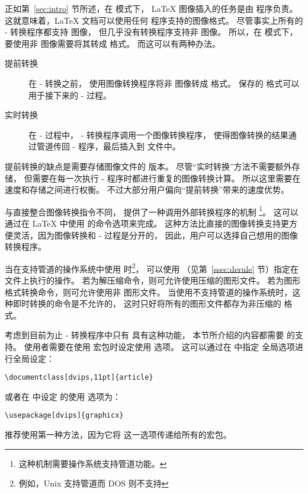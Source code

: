 正如第~\ref{sec:intro} 节所述，在  模式下，
\LaTeX{} 图像插入的任务是由  程序负责。
这就意味着，\LaTeX{} 文档可以使用任何  程序支持的图像格式。
尽管事实上所有的 - 转换程序都支持  图像，
但几乎没有转换程序支持非  图像。
所以，在  模式下，
要使用非  图像需要将其转成  格式。
而这可以有两种办法。
\begin{description}
	\item[提前转换] 在 - 转换之前，
	使用图像转换程序将非 图像转成 格式。
	保存的  格式可以用于接下来的 - 过程。
	
	\item[实时转换] 在 - 过程中，
	- 转换程序调用一个图像转换程序，
	使得图像转换的结果通过管道传回 - 程序，最后插入到  文件中。
\end{description}
提前转换的缺点是需要存储图像文件的  版本。
尽管“实时转换”方法不需要额外存储，
但需要在每一次执行 - 程序时都进行重复的图像转换计算。
所以这里需要在速度和存储之间进行权衡。
不过大部分用户偏向“提前转换”带来的速度优势。

与直接整合图像转换指令不同， 提供了一种调用外部转换程序的机制
\footnote{
	这种机制需要操作系统支持管道功能。}。
这可以通过在 \LaTeX{} 中使用  的命令选项来完成。
这种方法比直接的图像转换支持更方便灵活，因为图像转换和 - 过程是分开的，
因此，用户可以选择自己想用的图像转换程序。

当在支持管道的操作系统中使用  时\footnote{
	例如，Unix 支持管道而 DOS 则不支持}，
可以使用  （见第~\ref{ssec:derule} 节）指定在文件上执行的操作。
若为解压缩命令，则可允许使用压缩的图形文件。
若为图形格式转换命令，则可允许使用非  图形文件。
当使用不支持管道的操作系统时，这种即时转换的命令是不允许的，
这时只好将所有的图形文件都存为非压缩的  格式。

考虑到目前为止 - 转换程序中只有  具有这种功能，
本节所介绍的内容都需要  的支持。
使用者需要在使用  宏包时设定使用  选项。
这可以通过在  中指定  全局选项进行全局设定：
\begin{lstlisting}
\documentclass[dvips,11pt]{article}
\end{lstlisting}
或者在  中设定  的使用  选项为：
\begin{lstlisting}
\usepackage[dvips]{graphicx}
\end{lstlisting}
推荐使用第一种方法，因为它将  这一选项传递给所有的宏包。


